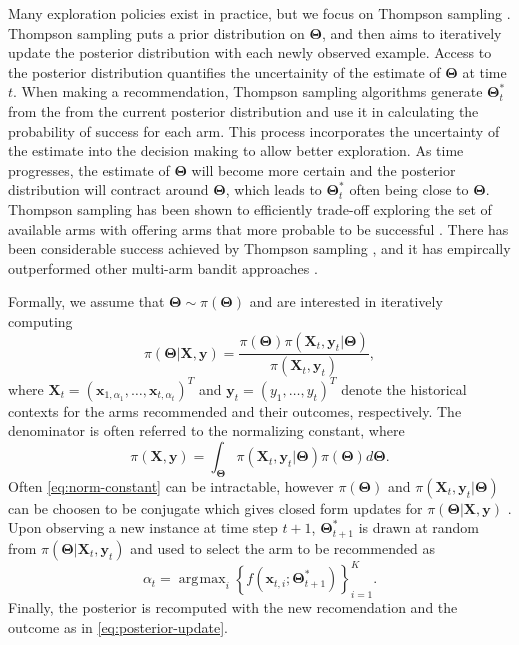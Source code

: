 \documentclass[12pt]{article}
\DeclareMathOperator*{\argmax}{\arg\!\max}
\begin{document}
Many exploration policies exist in practice, but we focus on Thompson sampling 
\cite{chapelle2011empirical} \cite{agrawal2012analysis}.
Thompson sampling puts a prior distribution on $\bm{\Theta}$, and then aims to 
iteratively update the posterior distribution with each newly observed example.
Access to the posterior distribution quantifies the uncertainity of the estimate 
of $\bm{\Theta}$ at time $t$.
When making a recommendation, Thompson sampling algorithms generate 
$\bm{\Theta}_t^*$ from the from the current posterior distribution and use it in 
calculating the probability of success for each arm.
This process incorporates the uncertainty of the estimate into the decision making 
to allow better exploration.
As time progresses, the estimate of $\bm{\Theta}$ will become more certain and
the posterior distribution will contract around $\bm{\Theta}$, which leads to 
$\bm{\Theta}_t^*$ often being close to $\bm{\Theta}$.
Thompson sampling has been shown to efficiently trade-off exploring the set of 
available arms with offering arms that more probable to be successful 
\cite{kaufmann2012thompson}.
There has been considerable success achieved by Thompson sampling 
\cite{ferreira2018online}, and it has empircally outperformed other multi-arm 
bandit approaches \cite{chapelle2011empirical}.

Formally, we assume that 
$\bm{\Theta} \sim \pi(\bm{\Theta})$
and are interested in iteratively computing 
\begin{equation}
\pi(\bm{\Theta} \vert \bm{X}, \bm{y})
= \frac{
    \pi(\bm{\Theta}) 
    \pi(\bm{X}_t, \bm{y}_t \vert \bm{\Theta})}
{\pi(\bm{X}_t, \bm{y}_t)},
\label{eq:posterior-update}
\end{equation}
where 
$\bm{X}_t = (\bm{x}_{1,\alpha_1}, \ldots, \bm{x}_{t,\alpha_t})^{T}$
and 
$\bm{y}_t = (y_1, \ldots, y_t)^{T}$
denote the historical contexts for the arms recommended and their outcomes, 
respectively.
The denominator is often referred to the normalizing constant, where
\begin{equation}
\pi(\bm{X}, \bm{y})
= \int_{\bm{\Theta}} 
\pi(\bm{X}_t, \bm{y}_t \vert \bm{\Theta}) 
\pi(\bm{\Theta}) 
d\bm{\Theta}.
\label{eq:norm-constant}
\end{equation}
Often \eqref{eq:norm-constant} can be intractable, however $\pi(\bm{\Theta})$
and $\pi(\bm{X}_t, \bm{y}_t \vert \bm{\Theta})$ can be choosen to be conjugate
which gives closed form updates for $\pi(\bm{\Theta} \vert \bm{X}, \bm{y})$ 
\cite{gelman2013bayesian}. 
Upon observing a new instance at time step $t + 1$, $\bm{\Theta}_{t+1}^*$ is drawn
at random from $\pi(\bm{\Theta} \vert \bm{X}_t, \bm{y}_t)$ and used to select the 
arm to be recommended as
\[
\alpha_t = \argmax_i \left\{f(\bm{x}_{t,i}; 
\bm{\Theta}_{t+1}^*)\right\}_{i = 1}^{K}.
\]
Finally, the posterior is recomputed with the new recomendation and the outcome 
as in \eqref{eq:posterior-update}.
\end{document}
